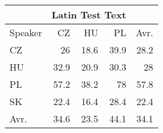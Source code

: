 \begin{tabular}{l|rrr|r}
\hline
 & \multicolumn{3}{c}{Latin Test Text} & \\
\hline
 Speaker   &   CZ &   HU &   PL &   Avr. \\
\hline
 CZ        & 26   & 18.6 & 39.9 &   28.2 \\
 HU        & 32.9 & 20.9 & 30.3 &   28   \\
 PL        & 57.2 & 38.2 & 78   &   57.8 \\
 SK        & 22.4 & 16.4 & 28.4 &   22.4 \\
\hline
 Avr.     & 34.6 & 23.5 & 44.1 &   34.1 \\
\hline
\end{tabular}